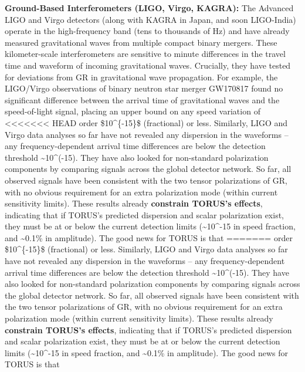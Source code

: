 \documentclass[]{article}
\begin{document}
\textbf{Ground-Based Interferometers (LIGO, Virgo, KAGRA):} The Advanced
LIGO and Virgo detectors (along with KAGRA in Japan, and soon
LIGO-India) operate in the high-frequency band (tens to thousands of Hz)
and have already measured gravitational waves from multiple compact
binary mergers. These kilometer-scale interferometers are sensitive to
minute differences in the travel time and waveform of incoming
gravitational waves. Crucially, they have tested for deviations from GR
in gravitational wave propagation. For example, the LIGO/Virgo
observations of binary neutron star merger GW170817 found no significant
difference between the arrival time of gravitational waves and the
speed-of-light signal, placing an upper bound on any speed variation of
<<<<<<< HEAD
order \$10\^{}\{-15\}\$ (fractional) or less\hspace{0pt}. Similarly,
LIGO and Virgo data analyses so far have not revealed any dispersion in
the waveforms -- any frequency-dependent arrival time differences are
below the detection threshold \textasciitilde10\^{}(-15)\hspace{0pt}.
They have also looked for non-standard polarization components by
comparing signals across the global detector network. So far, all
observed signals have been consistent with the two tensor polarizations
of GR, with no obvious requirement for an extra polarization mode
(within current sensitivity limits). These results already
\textbf{constrain TORUS's effects}, indicating that if TORUS's predicted
dispersion and scalar polarization exist, they must be at or below the
current detection limits (\textasciitilde10\^{}-15 in speed fraction,
and \textasciitilde0.1\% in amplitude). The good news for TORUS is that
=======
order \$10\^{}\{-15\}\$ (fractional) or less​. Similarly, LIGO and Virgo
data analyses so far have not revealed any dispersion in the waveforms
-- any frequency-dependent arrival time differences are below the
detection threshold \textasciitilde{}10\^{}(-15)​. They have also looked
for non-standard polarization components by comparing signals across the
global detector network. So far, all observed signals have been
consistent with the two tensor polarizations of GR, with no obvious
requirement for an extra polarization mode (within current sensitivity
limits). These results already \textbf{constrain TORUS's effects},
indicating that if TORUS's predicted dispersion and scalar polarization
exist, they must be at or below the current detection limits
(\textasciitilde{}10\^{}-15 in speed fraction, and
\textasciitilde{}0.1\% in amplitude). The good news for TORUS is that
\end{document}
